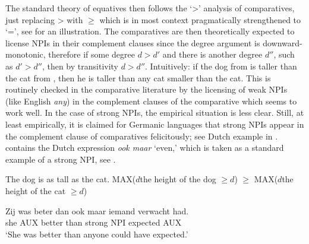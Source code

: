 The standard theory of equatives \citet{beck_comparison_nodate,stechow1984comparing,rullmann1995maximality} then follows the `>' analysis of comparatives, just replacing > with $\geq$ which is in most context pragmatically strengthened to `=', see  for an illustration. The comparatives are then theoretically expected to license NPIs in their complement clauses since the degree argument is downward-monotonic, therefore if some degree $d > d'$ and there is another degree $d''$, such as $d' > d''$, then by transitivity $d > d''$. Intuitively: if the dog from  is taller than the cat from , then he is taller than any cat smaller than the cat. This is routinely checked in the comparative literature by \citep{stechow1984comparing,rullmann1995maximality,gajewski2008more} the licensing of weak NPIs (like English \textit{any}) in the complement clauses of the comparative which seems to work well. In the case of strong NPIs, the empirical situation is less clear. Still, at least empirically, it is claimed for Germanic languages that strong NPIs appear in the complement clause of comparatives felicitously; see Dutch  example in .  contains the Dutch expression \textit{ook maar} `even,' which is taken as a standard example of a strong NPI, see \citet{zwarts1998three}.

\ea\label{ex-18} The dog is as tall as the cat. \ea MAX({$d$\vert the height of the dog $\geq d$}) $\geq$ MAX({$d$\vert the height of the cat $\geq d$})\z\z

\ea\label{ex-19} \gll Zij was beter dan ook maar iemand verwacht had.\\
she AUX better than strong NPI {} expected AUX\\
\glt `She was better than anyone could have expected.'
\z

